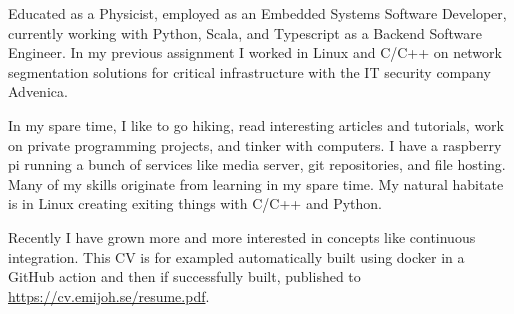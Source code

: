 

Educated as a Physicist, employed as an Embedded Systems Software Developer,
currently working with Python, Scala, and Typescript as a Backend Software
Engineer. In my previous assignment I worked in Linux and C/C++ on network
segmentation solutions for critical infrastructure with the IT security
company Advenica.

In my spare time, I like to go hiking, read interesting articles and
tutorials, work on private programming projects, and tinker with computers. I
have a raspberry pi running a bunch of services like media server, git
repositories, and file hosting. Many of my skills originate from learning in
my spare time. My natural habitate is in Linux creating exiting things with
C/C++ and Python.

Recently I have grown more and more interested in concepts like continuous
integration. This CV is for exampled automatically built using docker in a
GitHub action and then if successfully built, published
to \url{https://cv.emijoh.se/resume.pdf}.
